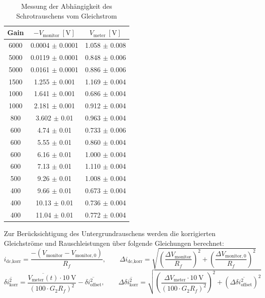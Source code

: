 \begin{table}[H]
    \centering
    \begin{tabular}{c|c|c}
        Gain & \(-V_{\text{monitor}}~[\text{V}]\) & \(V_{\text{meter}}~[\text{V}]\) \\
        \hline
        6000 & 0.0004 \(\pm\) 0.0001 & 1.058 \(\pm\) 0.008 \\
        5000 & 0.0119 \(\pm\) 0.0001 & 0.848 \(\pm\) 0.006 \\
        5000 & 0.0161 \(\pm\) 0.0001 & 0.886 \(\pm\) 0.006 \\
        1500 & 1.255 \(\pm\) 0.001 & 1.169 \(\pm\) 0.004 \\
        1000 & 1.641 \(\pm\) 0.001 & 0.686 \(\pm\) 0.004 \\
        1000 & 2.181 \(\pm\) 0.001 & 0.912 \(\pm\) 0.004 \\
        800 & 3.602 \(\pm\) 0.01 & 0.963 \(\pm\) 0.004 \\
        600 & 4.74 \(\pm\) 0.01 & 0.733 \(\pm\) 0.006 \\
        600 & 5.55 \(\pm\) 0.01 & 0.860 \(\pm\) 0.004 \\
        600 & 6.16 \(\pm\) 0.01 & 1.000 \(\pm\) 0.004 \\
        600 & 7.13 \(\pm\) 0.01 & 1.110 \(\pm\) 0.004 \\
        500 & 9.26 \(\pm\) 0.01 & 1.008 \(\pm\) 0.004 \\
        400 & 9.66 \(\pm\) 0.01 & 0.673 \(\pm\) 0.004 \\
        400 & 10.13 \(\pm\) 0.01 & 0.736 \(\pm\) 0.004 \\
        400 & 11.04 \(\pm\) 0.01 & 0.772 \(\pm\) 0.004 \\
    \end{tabular}
    \caption{Messung der Abhängigkeit des Schrotrauschens vom Gleichstrom}
    \label{tab:Schrot_Gleichstrom}
\end{table}


Zur Berücksichtigung des Untergrundrauschens werden die korrigierten Gleichströme und Rauschleistungen über folgende Gleichungen berechnet:
\begin{equation}
    i_{\text{dc,korr}} = \frac{-(V_{\text{monitor}} - V_{\text{monitor},0})}{R_f}, \qquad 
    \Delta i_{\text{dc,korr}} = \sqrt{\left(\frac{\Delta V_{\text{monitor}}}{R_f}\right)^2 + \left(\frac{\Delta V_{\text{monitor},0}}{R_f}\right)^2}
\end{equation}
\begin{equation}
    \overline{\delta i_{\text{korr}}^2} = \frac{\overline{V_{\text{meter}}(t)} \cdot 10~\text{V}}{(100 \cdot G_2 R_f)^2} - \overline{\delta i_{\text{offset}}^2}, \qquad 
    \Delta \overline{\delta i_{\text{korr}}^2} = \sqrt{\left(\frac{\Delta V_{\text{meter}} \cdot 10~\text{V}}{(100 \cdot G_2 R_f)^2}\right)^2 + \left(\Delta \overline{\delta i_{\text{offset}}^2}\right)^2}
\end{equation}

